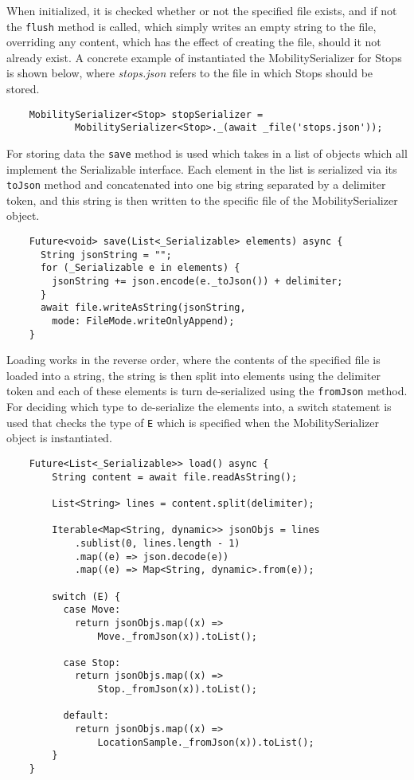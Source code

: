 When initialized, it is checked whether or not the specified file exists, and if not the \verb|flush| method is called, which simply writes an empty string to the file, overriding any content, which has the effect of creating the file, should it not already exist. A concrete example of instantiated the MobilitySerializer for Stops is shown below, where \textit{stops.json} refers to the file in which Stops should be stored.

\begin{verbatim}
    MobilitySerializer<Stop> stopSerializer =
            MobilitySerializer<Stop>._(await _file('stops.json'));
\end{verbatim}

For storing data the \verb|save| method is used which takes in a list of objects which all implement the Serializable interface. Each element in the list is serialized via its \verb|toJson| method and concatenated into one big string separated by a delimiter token, and this string is then written to the specific file of the MobilitySerializer object.

\begin{verbatim}
    Future<void> save(List<_Serializable> elements) async {
      String jsonString = "";
      for (_Serializable e in elements) {
        jsonString += json.encode(e._toJson()) + delimiter;
      }
      await file.writeAsString(jsonString, 
        mode: FileMode.writeOnlyAppend);
    }
\end{verbatim}

Loading works in the reverse order, where the contents of the specified file is loaded into a string, the string is then split into elements using the delimiter token and each of these elements is turn de-serialized using the \verb|fromJson| method.  For deciding which type to de-serialize the elements into, a switch statement is used that checks the type of \verb|E| which is specified when the MobilitySerializer object is instantiated.

\begin{verbatim}
    Future<List<_Serializable>> load() async {
        String content = await file.readAsString();
    
        List<String> lines = content.split(delimiter);
    
        Iterable<Map<String, dynamic>> jsonObjs = lines
            .sublist(0, lines.length - 1)
            .map((e) => json.decode(e))
            .map((e) => Map<String, dynamic>.from(e));
    
        switch (E) {
          case Move:
            return jsonObjs.map((x) => 
                Move._fromJson(x)).toList();
          
          case Stop:
            return jsonObjs.map((x) => 
                Stop._fromJson(x)).toList();
          
          default:
            return jsonObjs.map((x) => 
                LocationSample._fromJson(x)).toList();
        }
    }
\end{verbatim}

